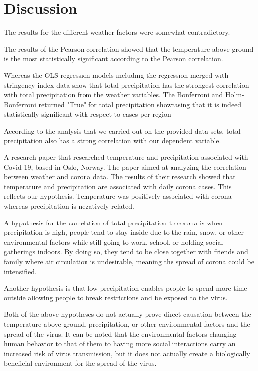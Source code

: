 \section{Discussion}

The results for the different weather factors were somewhat contradictory.

The results of the Pearson correlation showed that the temperature above ground is the most statistically significant according to the Pearson correlation.

Whereas the OLS regression models including the regression merged with stringency index data show that total precipitation has the strongest correlation with total precipitation from the weather variables. The Bonferroni and Holm-Bonferroni returned "True" for total precipitation showcasing that it is indeed statistically significant with respect to cases per region. 

According to the analysis that we carried out on the provided data sets, total precipitation also has a strong correlation with our dependent variable.

A research paper \citep{Menebo2020} that researched temperature and precipitation associated with Covid-19, based in Oslo, Norway. The paper aimed at analyzing the correlation between weather and corona data. The results of their research showed that temperature and precipitation are associated with daily corona cases. This reflects our hypothesis. Temperature was positively associated with corona whereas precipitation is negatively related.

A hypothesis for the correlation of total precipitation to corona is when precipitation is high, people tend to stay inside due to the rain, snow, or other environmental factors while still going to work, school, or holding social gatherings indoors. By doing so, they tend to be close together with friends and family where air circulation is undesirable, meaning the spread of corona could be intensified.

Another hypothesis is that low precipitation enables people to spend more time outside allowing people to break restrictions and be exposed to the virus.

Both of the above hypotheses do not actually prove direct causation between the temperature above ground, precipitation, or other environmental factors and the spread of the virus. It can be noted that the environmental factors changing human behavior to that of them to having more social interactions carry an increased risk of virus transmission, but it does not actually create a biologically beneficial environment for the spread of the virus.
